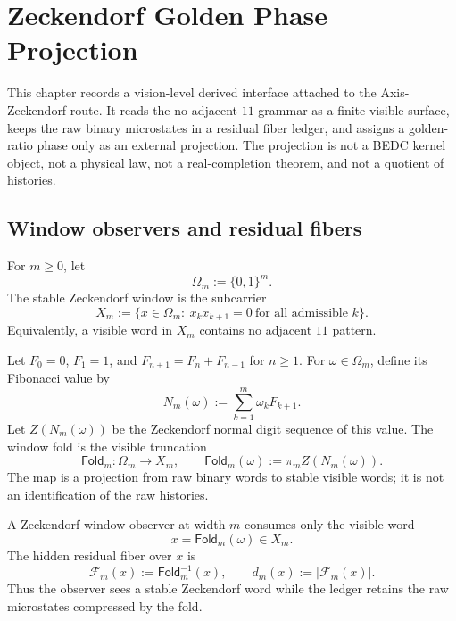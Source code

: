 \chapter{Zeckendorf Golden Phase Projection}
\label{ch:visions-zeckendorf-golden-phase-projection}

This chapter records a vision-level derived interface attached to the
Axis-Zeckendorf route. It reads the no-adjacent-\(11\) grammar as a
finite visible surface, keeps the raw binary microstates in a residual
fiber ledger, and assigns a golden-ratio phase only as an external
projection. The projection is not a BEDC kernel object, not a physical
law, not a real-completion theorem, and not a quotient of histories.

\section{Window observers and residual fibers}

\begin{definition}
\label{def:zeckendorf-stable-window}
For \(m\geq 0\), let
$$
  \Omega_m:=\{0,1\}^{m}.
$$
The stable Zeckendorf window is the subcarrier
$$
  X_m
  :=
  \{x\in\Omega_m:\ x_kx_{k+1}=0\ \text{for all admissible }k\}.
$$
Equivalently, a visible word in \(X_m\) contains no adjacent \(11\)
pattern.
\end{definition}

\begin{definition}
\label{def:zeckendorf-window-fold}
Let \(F_0=0\), \(F_1=1\), and \(F_{n+1}=F_n+F_{n-1}\) for \(n\geq 1\).
For \(\omega\in\Omega_m\), define its Fibonacci value by
$$
  N_m(\omega)
  :=
  \sum_{k=1}^{m}\omega_kF_{k+1}.
$$
Let \(Z(N_m(\omega))\) be the Zeckendorf normal digit sequence of this
value. The window fold is the visible truncation
$$
  \mathsf{Fold}_m:\Omega_m\to X_m,
  \qquad
  \mathsf{Fold}_m(\omega):=\pi_m Z(N_m(\omega)).
$$
The map is a projection from raw binary words to stable visible words;
it is not an identification of the raw histories.
\end{definition}

\begin{definition}
\label{def:zeckendorf-window-observer}
A Zeckendorf window observer at width \(m\) consumes only the visible
word
$$
  x=\mathsf{Fold}_m(\omega)\in X_m.
$$
The hidden residual fiber over \(x\) is
$$
  \mathcal{F}_m(x)
  :=
  \mathsf{Fold}_m^{-1}(x),
  \qquad
  d_m(x):=|\mathcal{F}_m(x)|.
$$
Thus the observer sees a stable Zeckendorf word while the ledger retains
the raw microstates compressed by the fold.
\end{definition}

